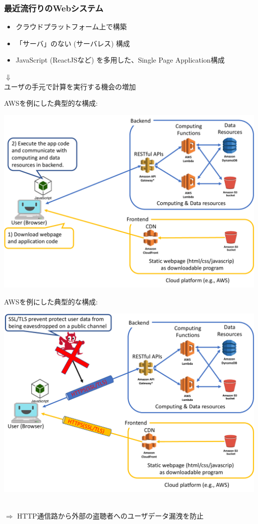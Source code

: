 \documentclass[12pt,dvipdfmx]{beamer}
\begin{document}
\begin{frame}
\frametitle{最近流行りのWebシステム}
\begin{itemize}
 \item クラウドプラットフォーム上で構築
 \item 「サーバ」のない (\alert{サーバレス}) 構成
 \item JavaScript (ReactJSなど) を多用した、Single Page Application構成
\end{itemize}
\begin{center}
$\Downarrow$\\
\alert{ユーザの手元で計算を実行する機会の増加}
\end{center}
\end{frame}

\begin{frame}
AWSを例にした典型的な構成:
\begin{center}
\includegraphics[width=0.85\linewidth]{Figs/spa1.pdf}
\end{center}
\end{frame}

\begin{frame}
AWSを例にした典型的な構成:
\begin{center}
\includegraphics[width=0.85\linewidth]{Figs/spa2.pdf}
\end{center}
\\
$\Rightarrow$ HTTP通信路から外部の盗聴者へのユーザデータ漏洩を防止
\end{frame}
\end{document}
